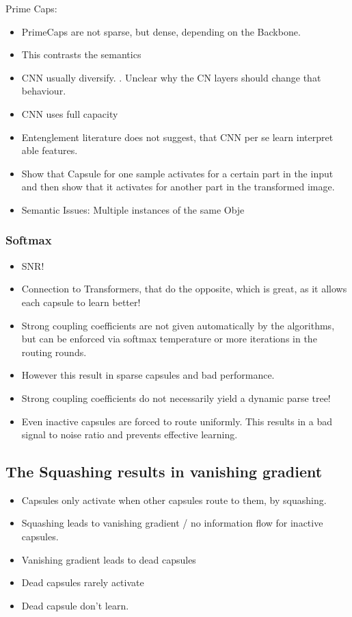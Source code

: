 \documentclass{article}
\begin{document}
Prime Caps:
\begin{itemize}
	\item PrimeCaps are not sparse, but dense, depending on the Backbone.
	\item This contrasts the semantics
	\item CNN usually diversify. . Unclear why the CN layers should change that behaviour.
	\item CNN uses full capacity
	\item Entenglement literature does not suggest, that CNN per se learn interpret able features.
	\item Show that Capsule for one sample activates for a certain part in the input and then show that it activates for another part in the transformed image.
	\item Semantic Issues: Multiple instances of the same Obje
\end{itemize}

\subsubsection*{Softmax}

\begin{itemize}
	\item SNR!
	\item Connection to Transformers, that do the opposite, which is great, as it allows each capsule to learn better!
	\item Strong coupling coefficients are not given automatically by the algorithms, but can be enforced via softmax temperature or more iterations in the routing rounds.
	\item However this result in sparse capsules and bad performance.
	\item Strong coupling coefficients do not necessarily yield a dynamic parse tree!
	\item Even inactive capsules are forced to route uniformly. This results in a bad signal to noise ratio and prevents effective learning.
\end{itemize}

\subsection*{The Squashing results in vanishing gradient}
\begin{itemize}
	\item Capsules only activate when other capsules route to them, by squashing.
	\item Squashing leads to vanishing gradient / no information flow for inactive capsules.
	\item Vanishing gradient leads to dead capsules
	\item Dead capsules rarely activate
	\item Dead capsule don't learn.
\end{itemize}
\end{document}
